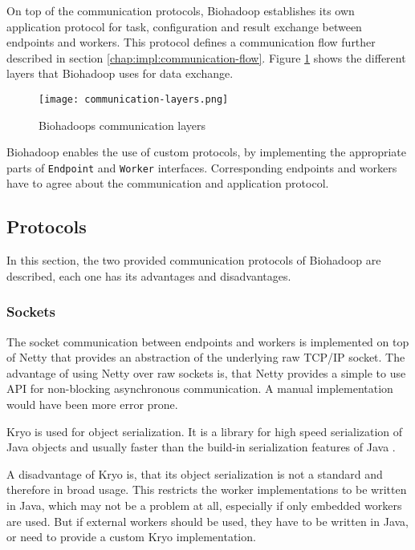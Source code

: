 On top of the communication protocols, Biohadoop establishes its own application protocol for task, configuration and result exchange between endpoints and workers. This protocol defines a communication flow further described in section \ref{chap:impl:communication-flow}. Figure \ref{fig:communication-layers} shows the different layers that Biohadoop uses for data exchange.

\begin{figure}[ht!]
  \centering
  \texttt{[image: communication-layers.png]}
  \caption{Biohadoops communication layers}
  \label{fig:communication-layers}
\end{figure}

Biohadoop enables the use of custom protocols, by implementing the appropriate parts of \texttt{Endpoint} and \texttt{Worker} interfaces. Corresponding endpoints and workers have to agree about the communication and application protocol.

\subsection{Protocols}
\label{chap:impl:protocols}
In this section, the two provided communication protocols of Biohadoop are described, each one has its advantages and disadvantages.

\subsubsection{Sockets}
The socket communication between endpoints and workers is implemented on top of Netty that provides an abstraction of the underlying raw TCP/IP socket. The advantage of using Netty over raw sockets is, that Netty provides a simple to use API for non-blocking asynchronous communication. A manual implementation would have been more error prone.

Kryo \cite{kryo} is used for object serialization. It is a library for high speed serialization of Java objects and usually faster than the build-in serialization features of Java \cite{jvm-serializers}.

A disadvantage of Kryo is, that its object serialization is not a standard and therefore in broad usage. This restricts the worker implementations to be written in Java, which may not be a problem at all, especially if only embedded workers are used. But if external workers should be used, they have to be written in Java, or need to provide a custom Kryo implementation.

